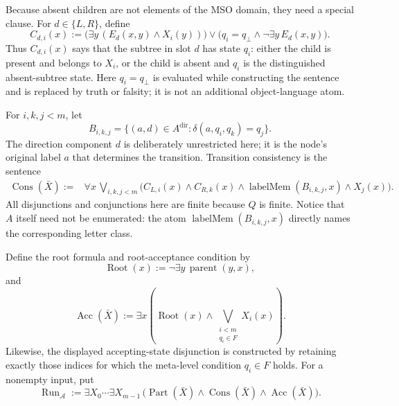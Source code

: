 \documentclass[11pt]{article}
\theoremstyle{definition}
\newcommand{\Aut}{\mathcal A}
\begin{document}
Because absent children are not elements of the MSO domain, they need a
special clause.  For \(d\in\{L,R\}\), define
\begin{equation}
\label{eq:child-carries-state}
  C_{d,i}(x):=
    \bigl(\exists y\,(E_d(x,y)\wedge X_i(y))\bigr)
    \vee
    \bigl(q_i=q_\bot\wedge\neg\exists y\,E_d(x,y)\bigr).
\end{equation}
Thus \(C_{d,i}(x)\) says that the subtree in slot \(d\) has state \(q_i\):
either the child is present and belongs to \(X_i\), or the child is absent and
\(q_i\) is the distinguished absent-subtree state.
Here \(q_i=q_\bot\) is evaluated while constructing the sentence and is
replaced by truth or falsity; it is not an additional object-language atom.

For \(i,k,j<m\), let
\begin{equation}
\label{eq:transition-letter-class}
  B_{i,k,j}
  =\{(a,d)\in A^{\mathrm{dir}}:
       \delta(a,q_i,q_k)=q_j\}.
\end{equation}
The direction component \(d\) is deliberately unrestricted here; it is the
node's original label \(a\) that determines the transition.  Transition
consistency is the sentence
\begin{equation}
\label{eq:run-transition-consistency}
\begin{split}
  \operatorname{Cons}(\bar X):={}&
  \forall x\,
  \bigvee_{i,k,j<m}
  \bigl(
    C_{L,i}(x)\wedge C_{R,k}(x)\wedge
    \operatorname{labelMem}(B_{i,k,j},x)\wedge X_j(x)
  \bigr).
\end{split}
\end{equation}
All disjunctions and conjunctions here are finite because \(Q\) is finite.
Notice that \(A\) itself need not be enumerated: the atom
\(\operatorname{labelMem}(B_{i,k,j},x)\) directly names the corresponding
letter class.

Define the root formula and root-acceptance condition by
\[
  \operatorname{Root}(x):=
    \neg\exists y\,\operatorname{parent}(y,x),
\]
and
\begin{equation}
\label{eq:run-root-acceptance}
  \operatorname{Acc}(\bar X):=
    \exists x\left(
      \operatorname{Root}(x)\wedge
      \bigvee_{\substack{i<m\\q_i\in F}}X_i(x)
    \right).
\end{equation}
Likewise, the displayed accepting-state disjunction is constructed by retaining
exactly those indices for which the meta-level condition \(q_i\in F\) holds.
For a nonempty input, put
\begin{equation}
\label{eq:nonempty-run-sentence}
  \operatorname{Run}_\Aut:=
  \exists X_0\cdots\exists X_{m-1}\,
  \bigl(
    \operatorname{Part}(\bar X)\wedge
    \operatorname{Cons}(\bar X)\wedge
    \operatorname{Acc}(\bar X)
  \bigr).
\end{equation}
\end{document}
